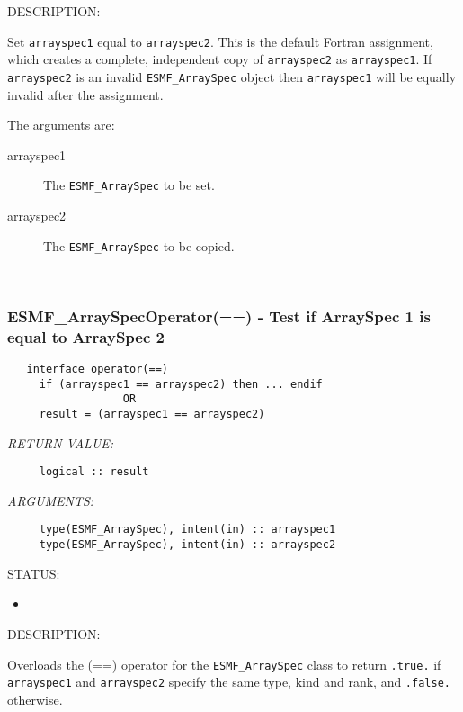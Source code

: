 {\sf DESCRIPTION:\\ }


     Set {\tt arrayspec1} equal to {\tt arrayspec2}. This is the default 
     Fortran assignment, which creates a complete, independent copy of 
     {\tt arrayspec2} as {\tt arrayspec1}. If {\tt arrayspec2} is an 
     invalid {\tt ESMF\_ArraySpec} object then {\tt arrayspec1} will be 
     equally invalid after the assignment.
  
     The arguments are:
     \begin{description} 
     \item[arrayspec1] 
       The {\tt ESMF\_ArraySpec} to be set.
     \item[arrayspec2] 
       The {\tt ESMF\_ArraySpec} to be copied.
     \end{description}
   
 
\mbox{}\hrulefill\ 
 
\subsubsection [ESMF\_ArraySpecOperator(==)] {ESMF\_ArraySpecOperator(==) - Test if ArraySpec 1 is equal to ArraySpec 2}


  
\begin{verbatim}   interface operator(==)
     if (arrayspec1 == arrayspec2) then ... endif
                  OR
     result = (arrayspec1 == arrayspec2)\end{verbatim}{\em RETURN VALUE:}
\begin{verbatim}     logical :: result\end{verbatim}{\em ARGUMENTS:}
\begin{verbatim}     type(ESMF_ArraySpec), intent(in) :: arrayspec1
     type(ESMF_ArraySpec), intent(in) :: arrayspec2\end{verbatim}
{\sf STATUS:}
   \begin{itemize}
   \item{}
   \end{itemize}
  
{\sf DESCRIPTION:\\ }


     Overloads the (==) operator for the {\tt ESMF\_ArraySpec} class to return 
     {\tt .true.} if {\tt arrayspec1} and {\tt arrayspec2} specify the same
     type, kind and rank, and {\tt .false.} otherwise.
  
